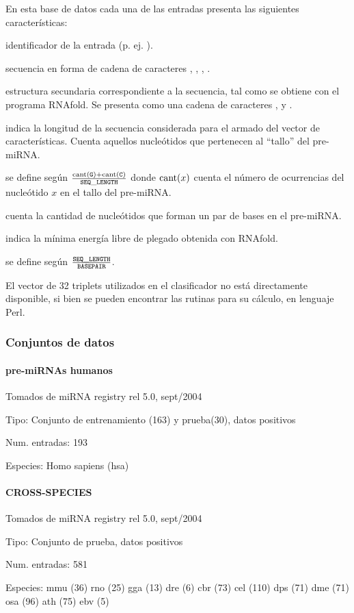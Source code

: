 \documentclass[12pt,bibliography=oldstyle,DIV=12,parskip=half-]{scrartcl}
\begin{document}
En esta base de datos cada una de las entradas presenta las siguientes
características:
\begin{description*}
%
\item[identificador] de la entrada (p. ej. ).
%
\item[secuencia] en forma de cadena de caracteres , ,
  , .
%
\item[estructura secundaria] correspondiente a la secuencia, tal como
  se obtiene con el programa RNAfold\cite{vienna}. Se presenta como
  una cadena de caracteres \mono{(},  y \mono{)}.
%
\item[\mono{SEQ\_LENGTH}] indica la longitud de la secuencia
  considerada para el armado del vector de características. Cuenta
  aquellos nucleótidos que pertenecen al ``tallo'' del pre-miRNA.
%
\item[\mono{GC\_CONTENT}] se define según
  $\frac{\textrm{cant}({\tt G})+\textrm{cant}({\tt C})}{{\tt SEQ\_LENGTH}}$
  donde $\textrm{cant}(x)$ cuenta el número de ocurrencias del nucleótido
  $x$ en el tallo del pre-miRNA.
%
\item[\mono{BASEPAIR}] cuenta la cantidad de nucleótidos
  que forman un par de bases en el pre-miRNA.
%
\item[\mono{FREE\_ENERGY}] indica la mínima energía libre de plegado
  obtenida con RNAfold.
%
\item[\mono{LEN\_BP\_RATIO}] se define según
  $\frac{{\tt SEQ\_LENGTH}}{{\tt BASEPAIR}}$.
\end{description*}
%
El vector de 32 triplets utilizados en el clasificador no está
directamente disponible, si bien se pueden encontrar las rutinas para su
cálculo, en lenguaje Perl.
%
\subsubsection{Conjuntos de datos}
\paragraph{pre-miRNAs humanos}
Tomados de miRNA registry rel 5.0, sept/2004
\begin{description*}
\item[Tipo:] Conjunto de entrenamiento (163) y prueba(30), datos
  positivos
\item[Num. entradas:] 193
\item[Especies:] Homo sapiens (hsa)
\end{description*}
\paragraph{CROSS-SPECIES}
Tomados de miRNA registry rel 5.0, sept/2004
\begin{description*}
\item[Tipo:] Conjunto de prueba, datos positivos
\item[Num. entradas:] 581
\item[Especies:]
  \quad mmu (36)
  \quad rno (25)
  \quad gga (13)
  \quad dre (6)
  \quad cbr (73)
  \quad cel (110)
  \quad dps (71)
  \quad dme (71)
  \quad osa (96)
  \quad ath (75)
  \quad ebv (5)
\end{description*}
%
\end{document}
